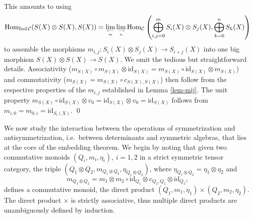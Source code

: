 \documentclass[11pt]{article}
\theoremstyle{definition}
\theoremstyle{definition}
\theoremstyle{remark}
\def\2#1{{\mathcal #1}}
\newcommand{\Hom}{\mathrm{Hom}}
\newcommand{\mcirc}{\circ}
\newcommand{\rarr}{\rightarrow}
\def\id{\mathrm{id}}
\begin{document}
\prf
This amounts to using
\[ \Hom_{\mathrm{Ind}\,\2C} (S(X)\otimes S(X),S(X))
   =\lim_{\longleftarrow\atop m}\lim_{\longrightarrow\atop n}
   \Hom_\2C\left(\bigoplus_{i,j=0}^m S_i(X)\otimes S_j(X),\bigoplus_{k=0}^n S_k(X)\right) \]
to assemble the morphisms $m_{i,j}: S_i(X)\otimes S_j(X)\rarr S_{i+j}(X)$ into one big 
morphism $S(X)\otimes S(X)\rarr S(X)$. 
We omit the tedious but straightforward details. Associativity
($m_{S(X)}\circ m_{S(X)}\otimes\id_{S(X)}=m_{S(X)}\circ\id_{S(X)}\otimes m_{S(X)}$) and
commutativity ($m_{S(X)}=m_{S(X)}\circ c_{S(X),S(X)}$) then follow  from the respective properties
of the $m_{i,j}$ established in Lemma \ref{lem-mij}. The unit property 
$m_{S(X)}\circ\id_{S(X)}\otimes v_0=\id_{S(X)}\otimes v_0=\id_{S(X)}$ follows from
$m_{i,0}=m_{0,i}=\id_{S_i(X)}$. 
\qed




We now study the interaction between the operations of symmetrization and antisymmetrization, i.e.\
between determinants and symmetric algebras, that lies at the core of the embedding theorem. We begin 
by noting that given two commutative monoids $(Q_i,m_i,\eta_i),\ i=1,2$ in a strict symmetric tensor
category, the triple $(Q_1\otimes Q_2,m_{Q_1\otimes   Q_2}, \eta_{Q_1\otimes Q_2})$, where 
$\eta_{Q_1\otimes Q_2}=\eta_1\otimes\eta_2$ and
\[ m_{Q_1\otimes Q_2}=m_1\otimes m_2\mcirc \id_{Q_1}\otimes c_{Q_2,Q_1}\otimes\id_{Q_2}, \]
defines a commutative monoid, the direct product $(Q_1,m_1,\eta_1)\times(Q_2,m_2,\eta_2)$.
The direct product $\times$ is strictly associative, thus multiple direct products are unambiguously 
defined by induction.
\end{document}

